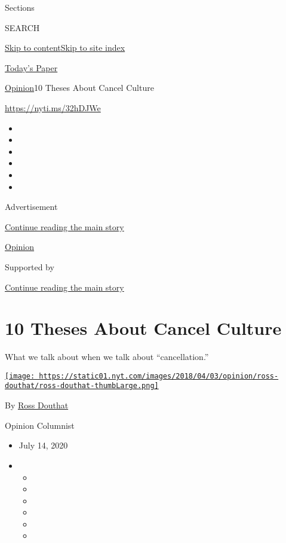 Sections

SEARCH

\protect\hyperlink{site-content}{Skip to
content}\protect\hyperlink{site-index}{Skip to site index}

\href{https://myaccount.nytimes.com/auth/login?response_type=cookie\&client_id=vi}{}

\href{https://www.nytimes.com/section/todayspaper}{Today's Paper}

\href{/section/opinion}{Opinion}\textbar{}10 Theses About Cancel Culture

\href{https://nyti.ms/32hDJWe}{https://nyti.ms/32hDJWe}

\begin{itemize}
\item
\item
\item
\item
\item
\item
\end{itemize}

Advertisement

\protect\hyperlink{after-top}{Continue reading the main story}

\href{/section/opinion}{Opinion}

Supported by

\protect\hyperlink{after-sponsor}{Continue reading the main story}

\hypertarget{10-theses-about-cancel-culture}{%
\section{10 Theses About Cancel
Culture}\label{10-theses-about-cancel-culture}}

What we talk about when we talk about ``cancellation.''

\href{https://www.nytimes.com/by/ross-douthat}{\texttt{[image: https://static01.nyt.com/images/2018/04/03/opinion/ross-douthat/ross-douthat-thumbLarge.png]}}

By \href{https://www.nytimes.com/by/ross-douthat}{Ross Douthat}

Opinion Columnist

\begin{itemize}
\item
  July 14, 2020
\item
  \begin{itemize}
  \item
  \item
  \item
  \item
  \item
  \item
  \end{itemize}
\end{itemize}


